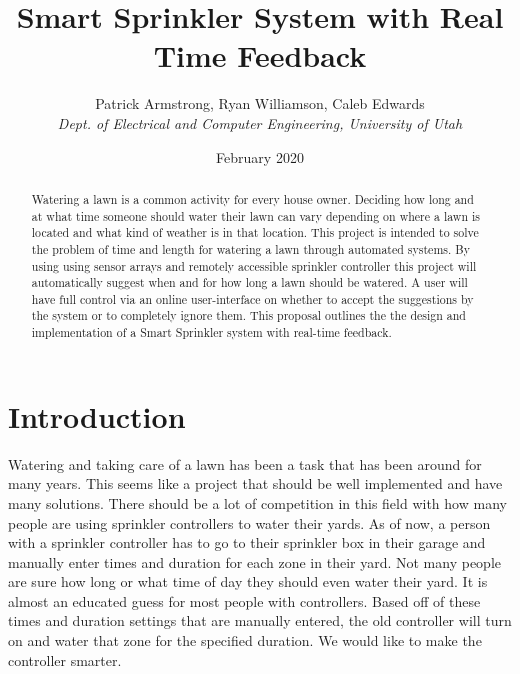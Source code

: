 \documentclass[letterpaper, 10 pt, conference]{ieeeconf}  %
\title{Smart Sprinkler System with Real Time Feedback}
\author{Patrick Armstrong, Ryan Williamson, Caleb Edwards\\
    \textit{Dept. of Electrical and Computer Engineering, University of Utah}
}
\date{February 2020}
\begin{document}
\maketitle

\begin{abstract}
Watering a lawn is a common activity for every house owner. Deciding how long and at what time someone should water their lawn can vary depending on where a lawn is located and what kind of weather is in that location. This project is intended to solve the problem of time and length for watering a lawn through automated systems. By using using sensor arrays and remotely accessible sprinkler controller this project will automatically suggest when and for how long a lawn should be watered. A user will have full control via an online user-interface on whether to accept the suggestions by the system or to completely ignore them. This proposal outlines the the design and implementation of a Smart Sprinkler system with real-time feedback.


\end{abstract}

\section{Introduction}
Watering and taking care of a lawn has been a task that has been around for many years. This seems like a project that should be well implemented and have many solutions. There should be a lot of competition in this field with how many people are using sprinkler controllers to water their yards. As of now, a person with a sprinkler controller has to go to their sprinkler box in their garage and manually enter times and duration for each zone in their yard. Not many people are sure how long or what time of day they should even water their yard. It is almost an educated guess for most people with controllers. Based off of these times and duration settings that are manually entered, the old controller will turn on and water that zone for the specified duration. We would like to make the controller smarter.
\end{document}
